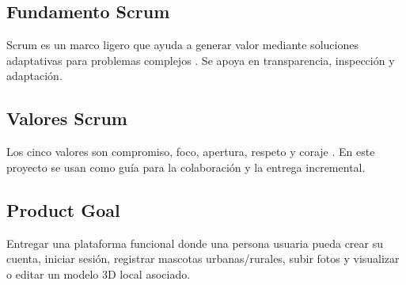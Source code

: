 \subsection{Fundamento Scrum}
Scrum es un marco ligero que ayuda a generar valor mediante soluciones adaptativas para problemas complejos \cite{schwaber2020}. Se apoya en transparencia, inspecci\'on y adaptaci\'on.

\subsection{Valores Scrum}
Los cinco valores son compromiso, foco, apertura, respeto y coraje \cite{schwaber2020}. En este proyecto se usan como gu\'ia para la colaboraci\'on y la entrega incremental.

\subsection{Product Goal}
Entregar una plataforma funcional donde una persona usuaria pueda crear su cuenta, iniciar sesi\'on, registrar mascotas urbanas/rurales, subir fotos y visualizar o editar un modelo 3D local asociado.
